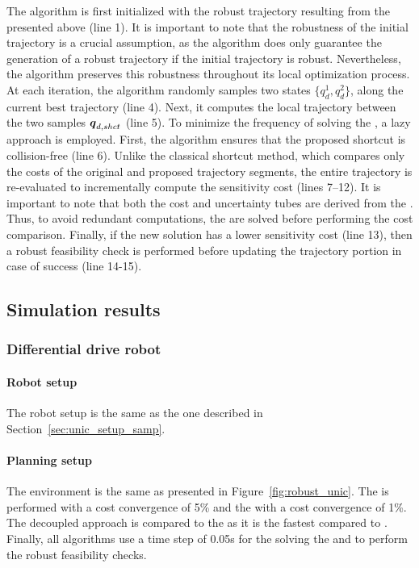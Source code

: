 The algorithm is first initialized with the robust trajectory resulting from the  presented above (line 1).
It is important to note that the robustness of the initial trajectory is a crucial assumption, as the  algorithm does only guarantee the generation of a robust trajectory if the initial trajectory is robust.
Nevertheless, the algorithm preserves this robustness throughout its local optimization process.
At each iteration, the algorithm randomly samples two states $\{q_d^{1}, q_d^{2}\}$, along the current best trajectory (line 4).
Next, it computes the local trajectory between the two samples $\boldsymbol{q}_{d,shct}$ (line 5).
To minimize the frequency of solving the , a lazy approach is employed.
First, the algorithm ensures that the proposed shortcut is collision-free (line 6). 
Unlike the classical shortcut method, which compares only the costs of the original and proposed trajectory segments, the entire trajectory is re-evaluated to incrementally compute the sensitivity cost (lines 7–12).
It is important to note that both the cost and uncertainty tubes are derived from the . 
Thus, to avoid redundant computations, the  are solved before performing the cost comparison.
Finally, if the new solution has a lower sensitivity cost (line 13), then a robust feasibility check is performed before updating the trajectory portion in case of success (line 14-15).

\subsection{Simulation results}
\subsubsection{Differential drive robot}

\paragraph{Robot setup}

The robot setup is the same as the one described in Section~\ref{sec:unic_setup_samp}.

\paragraph{Planning setup}

The environment is the same as presented in Figure~\ref{fig:robust_unic}.
The  is performed with a cost convergence of 5\% and the  with a cost convergence of 1\%.
The decoupled approach is compared to the  as it is the fastest compared to .
Finally, all algorithms use a time step of 0.05s for the solving the  and to perform the robust feasibility checks.


